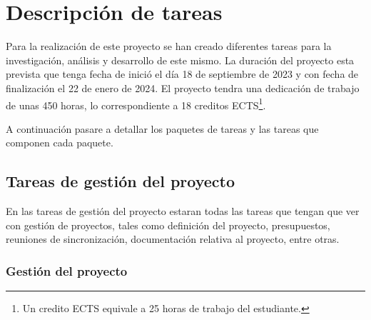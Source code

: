 \chapter{Descripción de tareas}
\label{cap:tareas}

Para la realización de este proyecto se han creado diferentes tareas para la investigación, análisis y desarrollo de este mismo. La duración del proyecto esta prevista 
que tenga fecha de inició el día 18 de septiembre de 2023 y con fecha de finalización el 22 de enero de 2024. El proyecto tendra una dedicación de trabajo de unas 450 horas,
lo correspondiente a 18 creditos ECTS\footnote{Un credito ECTS equivale a 25 horas de trabajo del estudiante.\cite{ECTS}}.

A continuación pasare a detallar los paquetes de tareas y las tareas que componen cada paquete.

\section{Tareas de gestión del proyecto}
\label{sec:tareas_gestion}

En las tareas de gestión del proyecto estaran todas las tareas que tengan que ver con gestión de proyectos, tales como definición del proyecto, presupuestos, reuniones de
sincronización, documentación relativa al proyecto, entre otras.

\subsection{Gestión del proyecto}
\label{subsec:tareas_gestion}

